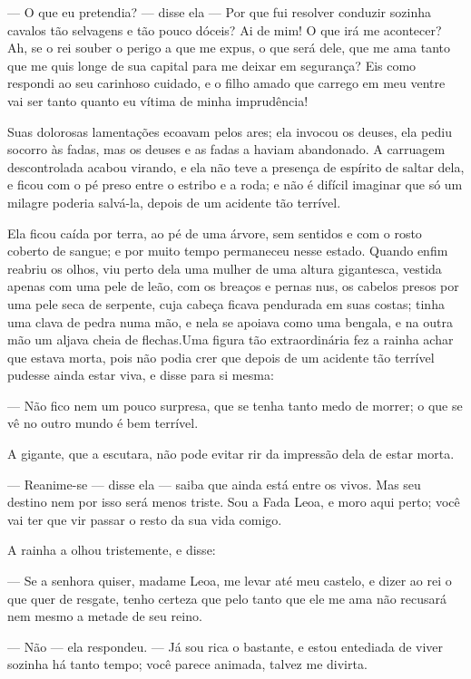 — O que eu pretendia? — disse ela — Por que fui resolver conduzir
sozinha cavalos tão selvagens e tão pouco dóceis? Ai de mim! O que
irá me acontecer? Ah, se o rei souber o perigo a que me expus, o que
será dele, que me ama tanto que me quis longe de sua capital para me
deixar em segurança? Eis como respondi ao seu carinhoso cuidado, e o
filho amado que carrego em meu ventre vai ser tanto quanto eu vítima
de minha imprudência!

Suas dolorosas lamentações ecoavam pelos ares; ela invocou os deuses,
ela pediu socorro às fadas, mas os deuses e as fadas a haviam
abandonado. A carruagem descontrolada acabou virando, e ela não teve
a presença de espírito de saltar dela, e ficou com o pé preso entre o
estribo e a roda; e não é difícil imaginar que só um milagre poderia
salvá-la, depois de um acidente tão terrível. 

Ela ficou caída por terra, ao pé de uma árvore, sem sentidos e com o
rosto coberto de sangue; e por muito tempo permaneceu nesse estado.
Quando enfim reabriu os olhos, viu perto dela uma mulher de uma
altura gigantesca, vestida apenas com uma pele de leão, com os
breaços e pernas nus, os cabelos presos por uma pele seca de
serpente, cuja cabeça ficava pendurada em suas costas; tinha uma
clava de pedra numa mão, e nela se apoiava como uma bengala, e na
outra mão um aljava cheia de flechas.Uma figura tão extraordinária
fez a rainha achar que estava morta, pois não podia crer que depois
de um acidente tão terrível pudesse ainda estar viva, e disse para si
mesma:

— Não fico nem um pouco surpresa, que se tenha tanto medo de morrer; o
que se vê no outro mundo é bem terrível.

A gigante, que a escutara, não pode evitar rir da impressão dela de
estar morta.

— Reanime-se — disse ela — saiba que ainda está entre os vivos. Mas
seu destino nem por isso será menos triste. Sou a Fada Leoa, e moro
aqui perto; você vai ter que vir passar o resto da sua vida comigo. 

A rainha a olhou tristemente, e disse:

— Se a senhora quiser, madame Leoa, me levar até meu castelo, e dizer
ao rei o que quer de resgate, tenho certeza que pelo tanto que ele me
ama não recusará nem mesmo a metade de seu reino.

— Não — ela respondeu. — Já sou rica o bastante, e estou entediada de
viver sozinha há tanto tempo; você parece animada, talvez me divirta.

